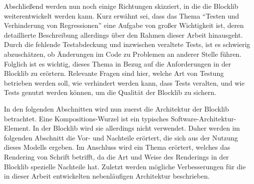 Abschließend werden nun noch einige Richtungen skizziert, in die die Blocklib weiterentwickelt werden kann. Kurz erwähnt sei, dass das Thema \enquote{Testen und Verhinderung von Regressionen} eine Aufgabe von großer Wichtigkeit ist,  deren detaillierte Beschreibung allerdings über den Rahmen dieser Arbeit hinausgeht. Durch die fehlende Testabdeckung und inzwischen veraltete Tests, ist es schwierig abzuschätzen, ob Änderungen im Code zu Problemen an anderer Stelle führen. Folglich ist es wichtig, dieses Thema in Bezug auf die Anforderungen in der Blocklib zu erörtern. Relevante Fragen sind hier, welche Art von Testung betrieben werden soll, wie verhindert werden kann, dass Tests veralten, und wie Tests genutzt werden können, um die Qualität der Blocklib zu sichern.

In den folgenden Abschnitten wird nun zuerst die Architektur der Blocklib betrachtet. Eine Kompositions-Wurzel ist ein typisches Software-Architektur-Element. In der Blocklib wird sie allerdings nicht verwendet. Daher werden im folgenden Abschnitt die Vor- und Nachteile erörtert, die sich aus der Nutzung dieses Modells ergeben. Im Anschluss wird ein Thema erörtert, welches das Rendering von Schrift betrifft, da die Art und Weise des Renderings in der Blocklib spezielle Nachteile hat. Zuletzt werden mögliche Verbesserungen für die in dieser Arbeit entwickelten nebenläufigen Architektur beschrieben.